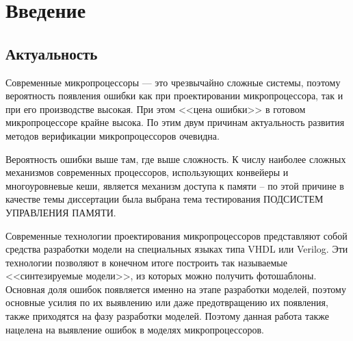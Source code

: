 \documentclass[14pt]{extreport}
\begin{document}
\pagebreak

\tableofcontents









\chapter*{Введение}

\section*{Актуальность}
Современные микропроцессоры --- это чрезвычайно сложные системы, поэтому вероятность появления ошибки как при проектировании микропроцессора, так и при его производстве высокая. При этом <<цена ошибки>> в готовом микропроцессоре крайне высока. По этим двум причинам актуальность развития методов верификации микропроцессоров очевидна. 

Вероятность ошибки выше там, где выше сложность. К числу наиболее сложных механизмов современных процессоров, использующих конвейеры и многоуровневые кеши, является механизм доступа к памяти – по этой причине в качестве темы диссертации была выбрана тема тестирования ПОДСИСТЕМ УПРАВЛЕНИЯ ПАМЯТИ.



Современные технологии проектирования микропроцессоров представляют собой средства разработки модели на специальных языках типа VHDL или Verilog. Эти технологии позволяют в конечном итоге построить так называемые <<синтезируемые модели>>, из которых можно получить фотошаблоны. Основная доля ошибок появляется именно на этапе разработки моделей, поэтому основные усилия по их выявлению или даже предотвращению их появления, также приходятся на фазу разработки моделей. Поэтому данная работа также нацелена на выявление ошибок в моделях микропроцессоров.
\end{document}
